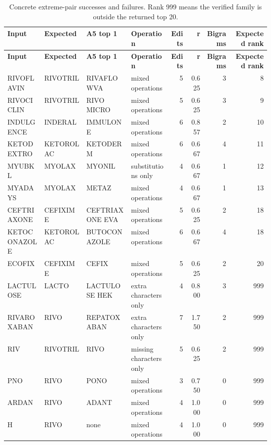 \begin{scriptsize}
\setlength{\tabcolsep}{1.5pt}
\renewcommand{\arraystretch}{1.05}
\begin{longtable}{@{}L{0.14\linewidth}L{0.16\linewidth}L{0.17\linewidth}L{0.15\linewidth}rrrr@{}}
\caption{Concrete extreme-pair successes and failures. Rank 999 means the verified family is outside the returned top 20.}\label{tab:expanded-extreme-examples}\\
\toprule
\textbf{Input} & \textbf{Expected} & \textbf{A5 top 1} & \textbf{Operation} & \textbf{Edits} & \textbf{r} & \textbf{Bigrams} & \textbf{Expected rank} \\
\midrule
\endfirsthead
\toprule
\textbf{Input} & \textbf{Expected} & \textbf{A5 top 1} & \textbf{Operation} & \textbf{Edits} & \textbf{r} & \textbf{Bigrams} & \textbf{Expected rank} \\
\midrule
\endhead
RIVOFLAVIN & RIVOTRIL & RIVAFLOWVA & mixed operations & 5 & 0.625 & 3 & 8 \\
RIVOCICLIN & RIVOTRIL & RIVO MICRO & mixed operations & 5 & 0.625 & 3 & 9 \\
INDULGENCE & INDERAL & IMMULONE & mixed operations & 6 & 0.857 & 2 & 10 \\
KETODEXTRO & KETOROLAC & KETODERM & mixed operations & 6 & 0.667 & 4 & 11 \\
MYUBKL & MYOLAX & MYONIL & substitutions only & 4 & 0.667 & 1 & 12 \\
MYADAYS & MYOLAX & METAZ & mixed operations & 4 & 0.667 & 1 & 13 \\
CEFTRIAXONE & CEFIXIME & CEFTRIAXONE EVA & mixed operations & 5 & 0.625 & 2 & 18 \\
KETOCONAZOLE & KETOROLAC & BUTOCONAZOLE & mixed operations & 6 & 0.667 & 4 & 18 \\
ECOFIX & CEFIXIME & CEFIX & mixed operations & 5 & 0.625 & 2 & 20 \\
LACTULOSE & LACTO & LACTULOSE HEK & extra characters only & 4 & 0.800 & 3 & 999 \\
RIVAROXABAN & RIVO & REPATOXABAN & extra characters only & 7 & 1.750 & 2 & 999 \\
RIV & RIVOTRIL & RIVO & missing characters only & 5 & 0.625 & 2 & 999 \\
PNO & RIVO & PONO & mixed operations & 3 & 0.750 & 0 & 999 \\
ARDAN & RIVO & ADANT & mixed operations & 4 & 1.000 & 0 & 999 \\
H & RIVO & none & mixed operations & 4 & 1.000 & 0 & 999 \\

\end{longtable}
\end{scriptsize}
